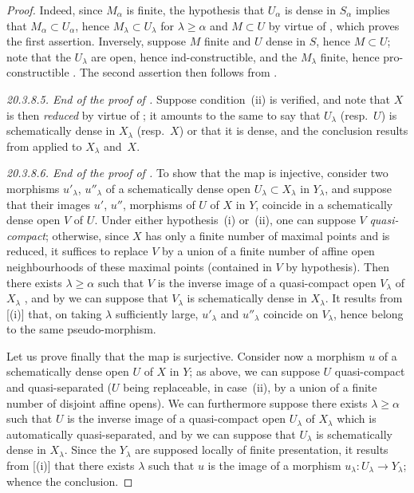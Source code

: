 \begin{proof}
Indeed, since $M_\alpha$ is finite, the hypothesis that $U_\alpha$ is dense in $S_\alpha$ implies that $M_\alpha\subset U_\alpha$, hence $M_\lambda\subset U_\lambda$ for $\lambda\geq\alpha$ and $M\subset U$ by virtue of , which proves the first assertion.
Inversely, suppose $M$ finite and $U$ dense in $S$, hence $M\subset U$; note that the $U_\lambda$ are open, hence ind-constructible, and the $M_\lambda$ finite, hence pro-constructible .
The second assertion then follows from .

\label{IV.20.3.8.5}
\emph{20.3.8.5. End of the proof of .}
Suppose condition~(ii) is verified, and note that $X$ is then \emph{reduced} by virtue of ;
it amounts to the same to say that $U_\lambda$ (resp.\ $U$) is schematically dense in $X_\lambda$ (resp.\ $X$) or that it is dense, and the conclusion results from  applied to $X_\lambda$ and~$X$.

\label{IV.20.3.8.6}
\emph{20.3.8.6. End of the proof of .}
To show that the map  is injective, consider two morphisms $u'_\lambda$, $u''_\lambda$ of a schematically dense open $U_\lambda\subset X_\lambda$ in $Y_\lambda$, and suppose that their images $u'$, $u''$, morphisms of $U$ of $X$ in $Y$, coincide in a schematically dense open $V$ of $U$.
Under either hypothesis~(i) or~(ii), one can suppose $V$ \emph{quasi-compact};
otherwise, since $X$ has only a finite number of maximal points and is reduced, it suffices to replace $V$ by a union of a finite number of affine open neighbourhoods of these maximal points (contained in $V$ by hypothesis).
Then there exists $\lambda\geq\alpha$ such that $V$ is the inverse image of a quasi-compact open $V_\lambda$ of $X_\lambda$ , and by  we can suppose that $V_\lambda$ is schematically dense in $X_\lambda$.
It results from [(i)] that, on taking $\lambda$ sufficiently large, $u'_\lambda$ and $u''_\lambda$ coincide on $V_\lambda$, hence belong to the same pseudo-morphism.

Let us prove finally that the map  is surjective.
Consider now a morphism $u$ of a schematically dense open $U$ of $X$ in $Y$;
as above, we can suppose $U$ quasi-compact and quasi-separated ($U$ being replaceable, in case~(ii), by a union of a finite number of disjoint affine opens).
We can furthermore suppose there exists $\lambda\geq\alpha$ such that $U$ is the inverse image of a quasi-compact open $U_\lambda$ of $X_\lambda$  which is automatically quasi-separated, and by  we can suppose that $U_\lambda$ is schematically dense in $X_\lambda$.
Since the $Y_\lambda$ are supposed locally of finite presentation, it results from [(i)] that there exists $\lambda$ such that $u$ is the image of a morphism $u_\lambda:U_\lambda\to Y_\lambda$; whence the conclusion.


\end{proof}
